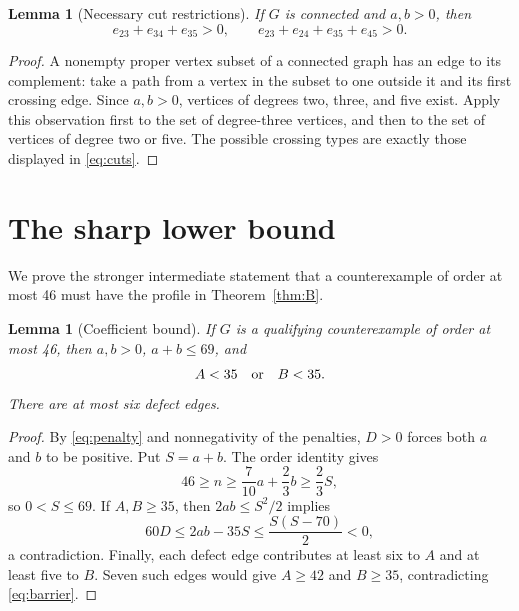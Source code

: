 \documentclass[11pt]{amsart}
\newtheorem{lemma}[theorem]{Lemma}
\theoremstyle{definition}
\theoremstyle{remark}
\begin{document}
\begin{lemma}[Necessary cut restrictions]\label{lem:cuts}
If $G$ is connected and $a,b>0$, then
\begin{equation}\label{eq:cuts}
 e_{23}+e_{34}+e_{35}>0,\qquad
 e_{23}+e_{24}+e_{35}+e_{45}>0.
\end{equation}
\end{lemma}
\begin{proof}
A nonempty proper vertex subset of a connected graph has an edge to its complement: take a path from a vertex in the subset to one outside it and its first crossing edge. Since $a,b>0$, vertices of degrees two, three, and five exist. Apply this observation first to the set of degree-three vertices, and then to the set of vertices of degree two or five. The possible crossing types are exactly those displayed in \eqref{eq:cuts}.
\end{proof}

\section{The sharp lower bound}\label{sec:lower}
We prove the stronger intermediate statement that a counterexample of order at most 46 must have the profile in Theorem~\ref{thm:B}.

\begin{lemma}[Coefficient bound]\label{lem:barrier}
If $G$ is a qualifying counterexample of order at most 46, then $a,b>0$, $a+b\le69$, and
\begin{equation}\label{eq:barrier}
 A<35\quad\hbox{or}\quad B<35.
\end{equation}
There are at most six defect edges.
\end{lemma}
\begin{proof}
By \eqref{eq:penalty} and nonnegativity of the penalties, $D>0$ forces both $a$ and $b$ to be positive. Put $S=a+b$. The order identity gives
\[
 46\ge n\ge\frac7{10}a+\frac23b\ge\frac23S,
\]
so $0<S\le69$. If $A,B\ge35$, then $2ab\le S^2/2$ implies
\[
 60D\le2ab-35S\le\frac{S(S-70)}2<0,
\]
a contradiction. Finally, each defect edge contributes at least six to $A$ and at least five to $B$. Seven such edges would give $A\ge42$ and $B\ge35$, contradicting \eqref{eq:barrier}.
\end{proof}
\end{document}
